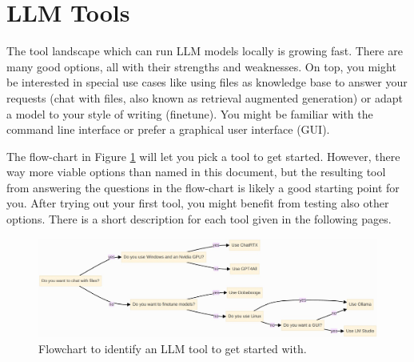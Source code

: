 \documentclass[parskip=half]{scrreprt} %
\begin{document}
\section{LLM Tools}
The tool landscape which can run LLM models locally is growing fast. There are many good options, all with their strengths and weaknesses.
On top, you might be interested in special use cases like using files as knowledge base to answer your requests (chat with files, also known as retrieval augmented generation) or adapt a model to your style of writing (finetune).
You might be familiar with the command line interface or prefer a graphical user interface (GUI).

The flow-chart in Figure \ref{fig:flowchart} will let you pick a tool to get started.
However, there way more viable options than named in this document, but the resulting tool from answering the questions in the flow-chart is likely a good starting point for you.
After trying out your first tool, you might benefit from testing also other options.
There is a short description for each tool given in the following pages.

\begin{figure}[h]
	\includegraphics[width=\textwidth]{llm-tools-flowchart}
	\caption{Flowchart to identify an LLM tool to get started with.}
	\centering
	\label{fig:flowchart}
\end{figure}
\end{document}
